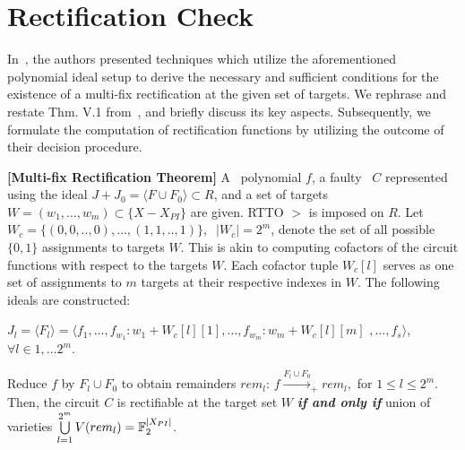 \section{Rectification Check}\label{sec:rcheck}

In~\cite{Vkrao:ISQED21}, the authors presented techniques 
which utilize the aforementioned polynomial ideal setup
to derive the necessary and sufficient conditions for the existence
of a multi-fix rectification at the given set of targets.
We rephrase and restate Thm. V.1 from~\cite{Vkrao:ISQED21}, and 
briefly discuss its key aspects. 
Subsequently, we formulate the computation of rectification functions by utilizing
the outcome of their decision procedure.

\begin{Theorem}{\bf [Multi-fix Rectification Theorem]}\label{Thm:rect}
A \spec~polynomial $f$, a faulty 
\impl~$C$ represented using the ideal 
$J +J_0 = \langle F \cup F_0\rangle \subset R$,
 and a set of targets $W=(w_1,\dots,w_m) \subset \{X-X_{PI}\}$
 are given. 
RTTO $>$ is imposed on $R$. Let $W_c = \{(0,0,..,0),\dots,(1,1,..,1)\},$ $~|W_c| = 2^m$, 
 denote the set of all possible $\{0,1\}$ assignments to targets $W$.
 This is akin to computing cofactors of the circuit functions with 
 respect to the targets $W$.
Each cofactor tuple $W_c[l]$ serves as one set
 of assignments to $m$ targets at their respective indexes in $W$. 
The following ideals are constructed:  
\bi
\item {\small $J_l = \langle F_l\rangle =\langle f_1,\dots,f_{w_1}:w_1+W_c[l][1],
	\dots,f_{w_m}:w_m+W_c[l][m]$ $,\dots,f_s\rangle$}, $\forall l \in 1,\dots 2^m$. 
\ei

Reduce $f$ by $F_l\cup F_0$ to obtain remainders $rem_l$: 
$f\xrightarrow{F_l\cup F_{0}}_+ rem_l,$  for $1 \leq l \leq 2^m$.
Then, the circuit $C$ is rectifiable at the target set $W$ {\bf\textit{if
   and only if}} union of varieties $\bigcup\limits_{l=1}^{2^m}V(rem_l) = {\mathbb{F}}_{2}^{|X_{PI}|}$. 
\end{Theorem}

